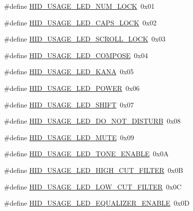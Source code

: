 \begin{DoxyCompactItemize}
\item 
\#define \hyperlink{group__USBD__HID_ga36ce120868adf30bbd161bb7dc158381}{H\+I\+D\+\_\+\+U\+S\+A\+G\+E\+\_\+\+L\+E\+D\+\_\+\+N\+U\+M\+\_\+\+L\+O\+CK}~0x01
\item 
\#define \hyperlink{group__USBD__HID_gae6f37265467778fb821c13aacfb874f4}{H\+I\+D\+\_\+\+U\+S\+A\+G\+E\+\_\+\+L\+E\+D\+\_\+\+C\+A\+P\+S\+\_\+\+L\+O\+CK}~0x02
\item 
\#define \hyperlink{group__USBD__HID_ga65d50a5eda9c4d5664052d524d362aa4}{H\+I\+D\+\_\+\+U\+S\+A\+G\+E\+\_\+\+L\+E\+D\+\_\+\+S\+C\+R\+O\+L\+L\+\_\+\+L\+O\+CK}~0x03
\item 
\#define \hyperlink{group__USBD__HID_ga24e2ff6f63b971ae8ac48b2fa0c4a3e2}{H\+I\+D\+\_\+\+U\+S\+A\+G\+E\+\_\+\+L\+E\+D\+\_\+\+C\+O\+M\+P\+O\+SE}~0x04
\item 
\#define \hyperlink{group__USBD__HID_ga0358c17c119b7b06e426eaf9c165c51c}{H\+I\+D\+\_\+\+U\+S\+A\+G\+E\+\_\+\+L\+E\+D\+\_\+\+K\+A\+NA}~0x05
\item 
\#define \hyperlink{group__USBD__HID_ga0fc37c52b98493e8624b79cd4ba38069}{H\+I\+D\+\_\+\+U\+S\+A\+G\+E\+\_\+\+L\+E\+D\+\_\+\+P\+O\+W\+ER}~0x06
\item 
\#define \hyperlink{group__USBD__HID_gaa6ef098f1cb5963537ab9fe7cc270d98}{H\+I\+D\+\_\+\+U\+S\+A\+G\+E\+\_\+\+L\+E\+D\+\_\+\+S\+H\+I\+FT}~0x07
\item 
\#define \hyperlink{group__USBD__HID_ga82d00da266c3f871bc2336baeb101418}{H\+I\+D\+\_\+\+U\+S\+A\+G\+E\+\_\+\+L\+E\+D\+\_\+\+D\+O\+\_\+\+N\+O\+T\+\_\+\+D\+I\+S\+T\+U\+RB}~0x08
\item 
\#define \hyperlink{group__USBD__HID_gad7c327bb6d5f71b16aa1823220d74254}{H\+I\+D\+\_\+\+U\+S\+A\+G\+E\+\_\+\+L\+E\+D\+\_\+\+M\+U\+TE}~0x09
\item 
\#define \hyperlink{group__USBD__HID_gad2bd4321ce65e012ab24b7e1cbb7ae64}{H\+I\+D\+\_\+\+U\+S\+A\+G\+E\+\_\+\+L\+E\+D\+\_\+\+T\+O\+N\+E\+\_\+\+E\+N\+A\+B\+LE}~0x0A
\item 
\#define \hyperlink{group__USBD__HID_gae28056389c74cec9b970183d9e2853e0}{H\+I\+D\+\_\+\+U\+S\+A\+G\+E\+\_\+\+L\+E\+D\+\_\+\+H\+I\+G\+H\+\_\+\+C\+U\+T\+\_\+\+F\+I\+L\+T\+ER}~0x0B
\item 
\#define \hyperlink{group__USBD__HID_ga2ca4f7cb4ce5ab8e3e8c78a5a65449bd}{H\+I\+D\+\_\+\+U\+S\+A\+G\+E\+\_\+\+L\+E\+D\+\_\+\+L\+O\+W\+\_\+\+C\+U\+T\+\_\+\+F\+I\+L\+T\+ER}~0x0C
\item 
\#define \hyperlink{group__USBD__HID_ga5e1b129c958ac19634d4100ba5e80291}{H\+I\+D\+\_\+\+U\+S\+A\+G\+E\+\_\+\+L\+E\+D\+\_\+\+E\+Q\+U\+A\+L\+I\+Z\+E\+R\+\_\+\+E\+N\+A\+B\+LE}~0x0D

\end{DoxyCompactItemize}
